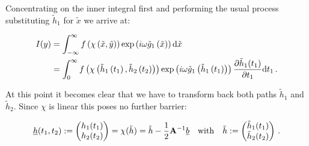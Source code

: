 \documentclass[a4paper,10pt]{article}
\begin{document}
Concentrating on the inner integral first and performing the
usual process substituting $\tilde{h}_1$ for $\tilde{x}$ we
arrive at:


\begin{equation}
\begin{split}
 I(y) & = \int_{-\infty}^{\infty}
           f\left(\chi\left(\tilde{x}, \tilde{y}\right)\right)
           \exp\left(i \omega \tilde{g}_1\left(\tilde{x}\right)\right)
          \mathrm{d}\tilde{x} \\
      & =  \int_0^{\infty}
           f\left(\chi\left(
             \tilde{h}_1\left(t_1\right),
             \tilde{h}_2\left(t_2\right)
           \right)\right)
           \exp\left(i \omega \tilde{g}_1\left(
             \tilde{h}_1\left(t_1\right)
           \right)\right)
           \frac{\partial \tilde{h}_1(t_1)}{\partial t_1}
          \mathrm{d}t_1 \,.
\end{split}
\end{equation}

At this point it becomes clear that we have to transform back both paths
$\tilde{h}_1$ and $\tilde{h}_2$. Since $\chi$ is linear this poses no
further barrier:

\begin{equation}
 \underline{h}(t_1, t_2) :=
 \begin{pmatrix}
  h_1(t_1) \\ h_2(t_2)
 \end{pmatrix}
 = \chi(\tilde{h})
 = \tilde{h} - \frac{1}{2}\mathbf{A}{}^{-1}\underline{b}
 \quad \mathrm{with} \quad
 \tilde{h} :=
 \begin{pmatrix}
  \tilde{h}_1(t_1) \\ \tilde{h}_2(t_2)
 \end{pmatrix} \,.
\end{equation}
\end{document}
